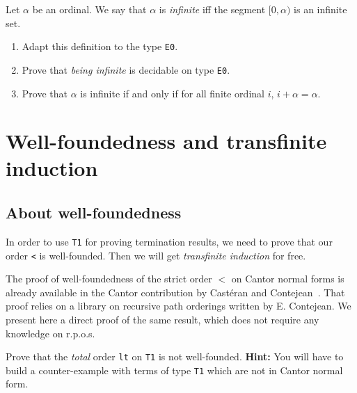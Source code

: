 \documentclass[a4paper]{book}
\begin{document}
 \begin{exercise}
Let $\alpha$ be an ordinal. We say that $\alpha$ is \emph{infinite} iff the segment $[0,\alpha)$ is an infinite set. 
\begin{enumerate}
\item Adapt this definition to the type \texttt{E0}.
\item Prove that \emph{being infinite} is decidable on type \texttt{E0}.
\item Prove that $\alpha$ is infinite if and only if for all finite ordinal $i$,
$i+\alpha=\alpha$.
\end{enumerate}
 \end{exercise}

\section{Well-foundedness and transfinite induction}


\subsection{About  well-foundedness}
\label{sec:orgheadline82}
   In order to use \texttt{T1} for proving termination results,
we need to prove that  our order \texttt{<} is well-founded. Then we will get \emph{transfinite induction} for free.


The proof of well-foundedness of the strict order $<$ on Cantor normal forms is already 
available in the Cantor contribution by Castéran and Contejean~\cite{CantorContrib}. That proof relies on a library on recursive path orderings written by
E. Contejean. We present here  a direct proof of the same result, which does not require any knowledge on r.p.o.s.


\begin{exercise}
Prove that the \emph{total} order \texttt{lt} on \texttt{T1} is not well-founded. 
\textbf{Hint:}  You will have to build a counter-example with terms of type \texttt{T1}
which are not in Cantor normal form.
\end{exercise}

\end{document}
